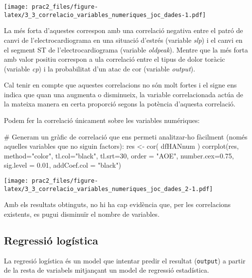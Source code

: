 \documentclass[
]{article}
\newenvironment{Shaded}{\begin{snugshade}}{\end{snugshade}}
\newcommand{\AttributeTok}[1]{\textcolor[rgb]{0.80,0.80,0.80}{#1}}
\newcommand{\CommentTok}[1]{\textcolor[rgb]{0.50,0.62,0.50}{#1}}
\newcommand{\DecValTok}[1]{\textcolor[rgb]{0.86,0.86,0.80}{#1}}
\newcommand{\FloatTok}[1]{\textcolor[rgb]{0.75,0.75,0.82}{#1}}
\newcommand{\FunctionTok}[1]{\textcolor[rgb]{0.94,0.94,0.56}{#1}}
\newcommand{\NormalTok}[1]{\textcolor[rgb]{0.80,0.80,0.80}{#1}}
\newcommand{\OtherTok}[1]{\textcolor[rgb]{0.94,0.94,0.56}{#1}}
\newcommand{\StringTok}[1]{\textcolor[rgb]{0.80,0.58,0.58}{#1}}
\begin{document}
\texttt{[image: prac2\_files/figure-latex/3\_3\_correlacio\_variables\_numeriques\_joc\_dades-1.pdf]}

La més forta d'aquestes correspon amb una correlació negativa entre el
patró de canvi de l'electrocardiograma en una situació d'estrés
(variable \emph{slp}) i el canvi en el segment ST de
l'electrocardiograma (variable \emph{oldpeak}). Mentre que la més forta
amb valor positiu correspon a ula correlació entre el tipus de dolor
toràcic (variable \emph{cp}) i la probabilitat d'un atac de cor
(variable \emph{output}).

Cal tenir en compte que aquestes correlacions no són molt fortes i el
signe ens indica que quan una augmenta o disminueix, la variable
correlacionada actúa de la mateixa manera en certa proporció segons la
potència d'aquesta correlació.

Podem fer la correlació únicament sobre les variables numériques:

\begin{Shaded}
\begin{Highlighting}[]
\CommentTok{\# Generam un gràfic de correlació que ens permeti analitzar{-}ho fàcilment (només aquelles variables que no siguin factors):}
\NormalTok{res }\OtherTok{\textless{}{-}} \FunctionTok{cor}\NormalTok{( dfHANnum )}
\FunctionTok{corrplot}\NormalTok{(res, }\AttributeTok{method=}\StringTok{"color"}\NormalTok{, }\AttributeTok{tl.col=}\StringTok{"black"}\NormalTok{, }\AttributeTok{tl.srt=}\DecValTok{30}\NormalTok{, }\AttributeTok{order =} \StringTok{"AOE"}\NormalTok{, }\AttributeTok{number.cex=}\FloatTok{0.75}\NormalTok{, }\AttributeTok{sig.level =} \FloatTok{0.01}\NormalTok{, }\AttributeTok{addCoef.col =} \StringTok{"black"}\NormalTok{)}
\end{Highlighting}
\end{Shaded}

\texttt{[image: prac2\_files/figure-latex/3\_3\_correlacio\_variables\_numeriques\_joc\_dades\_2-1.pdf]}

Amb els resultats obtinguts, no hi ha cap evidència que, per les
correlacions existents, es pugui disminuïr el nombre de variables.

\hypertarget{regressiuxf3-loguxedstica}{%
\subsection{Regressió logística}\label{regressiuxf3-loguxedstica}}

La regresió logística és un model que intentar predir el resultat
(\texttt{output}) a partir de la resta de variabels mitjançant un model
de regressió estadística.
\end{document}
